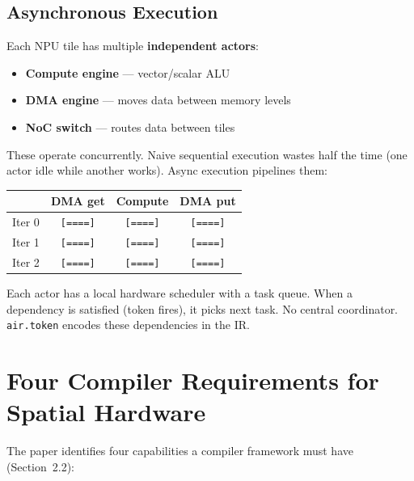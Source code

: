 \documentclass[11pt,a4paper]{article}
\begin{document}
\subsection{Asynchronous Execution}

Each NPU tile has multiple \textbf{independent actors}:
\begin{itemize}[leftmargin=2em]
  \item \textbf{Compute engine} --- vector/scalar ALU
  \item \textbf{DMA engine} --- moves data between memory levels
  \item \textbf{NoC switch} --- routes data between tiles
\end{itemize}

These operate concurrently. Naive sequential execution wastes half the time (one actor
idle while another works). Async execution pipelines them:

\begin{center}
\begin{tabular}{lccc}
\toprule
& DMA get & Compute & DMA put \\
\midrule
Iter 0 & \texttt{[====]} & \texttt{[====]} & \texttt{[====]} \\
Iter 1 & \quad\texttt{[====]} & \quad\texttt{[====]} & \quad\texttt{[====]} \\
Iter 2 & \qquad\texttt{[====]} & \qquad\texttt{[====]} & \qquad\texttt{[====]} \\
\bottomrule
\end{tabular}
\end{center}

Each actor has a local hardware scheduler with a task queue. When a dependency is
satisfied (token fires), it picks next task. No central coordinator.
\texttt{air.token} encodes these dependencies in the IR.


\section{Four Compiler Requirements for Spatial Hardware}

The paper identifies four capabilities a compiler framework must have (Section~2.2):
\end{document}
